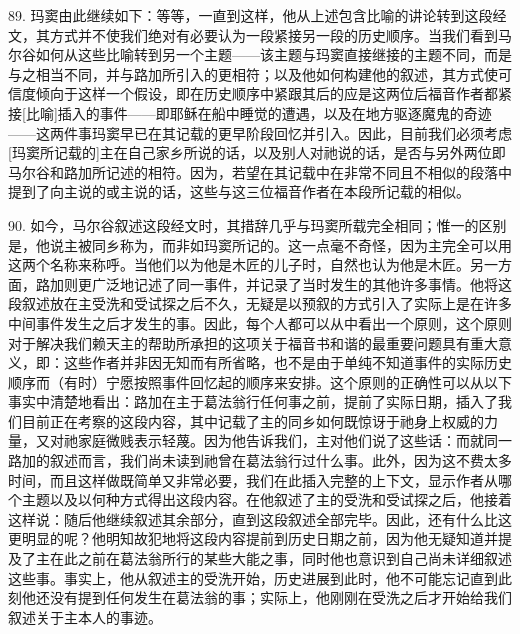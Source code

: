 89. 玛窦由此继续如下：等等，一直到这样，他从上述包含比喻的讲论转到这段经文，其方式并不使我们绝对有必要认为一段紧接另一段的历史顺序。当我们看到马尔谷如何从这些比喻转到另一个主题——该主题与玛窦直接继接的主题不同，而是与之相当不同，并与路加所引入的更相符；以及他如何构建他的叙述，其方式使可信度倾向于这样一个假设，即在历史顺序中紧跟其后的应是这两位后福音作者都紧接[比喻]插入的事件——即耶稣在船中睡觉的遭遇，以及在地方驱逐魔鬼的奇迹——这两件事玛窦早已在其记载的更早阶段回忆并引入。因此，目前我们必须考虑[玛窦所记载的]主在自己家乡所说的话，以及别人对祂说的话，是否与另外两位即马尔谷和路加所记述的相符。因为，若望在其记载中在非常不同且不相似的段落中提到了向主说的或主说的话，这些与这三位福音作者在本段所记载的相似。\par

90. 如今，马尔谷叙述这段经文时，其措辞几乎与玛窦所载完全相同；惟一的区别是，他说主被同乡称为，而非如玛窦所记的。这一点毫不奇怪，因为主完全可以用这两个名称来称呼。当他们以为他是木匠的儿子时，自然也认为他是木匠。另一方面，路加则更广泛地记述了同一事件，并记录了当时发生的其他许多事情。他将这段叙述放在主受洗和受试探之后不久，无疑是以预叙的方式引入了实际上是在许多中间事件发生之后才发生的事。因此，每个人都可以从中看出一个原则，这个原则对于解决我们赖天主的帮助所承担的这项关于福音书和谐的最重要问题具有重大意义，即：这些作者并非因无知而有所省略，也不是由于单纯不知道事件的实际历史顺序而（有时）宁愿按照事件回忆起的顺序来安排。这个原则的正确性可以从以下事实中清楚地看出：路加在主于葛法翁行任何事之前，提前了实际日期，插入了我们目前正在考察的这段内容，其中记载了主的同乡如何既惊讶于祂身上权威的力量，又对祂家庭微贱表示轻蔑。因为他告诉我们，主对他们说了这些话：而就同一路加的叙述而言，我们尚未读到祂曾在葛法翁行过什么事。此外，因为这不费太多时间，而且这样做既简单又非常必要，我们在此插入完整的上下文，显示作者从哪个主题以及以何种方式得出这段内容。在他叙述了主的受洗和受试探之后，他接着这样说：随后他继续叙述其余部分，直到这段叙述全部完毕。因此，还有什么比这更明显的呢？他明知故犯地将这段内容提前到历史日期之前，因为他无疑知道并提及了主在此之前在葛法翁所行的某些大能之事，同时他也意识到自己尚未详细叙述这些事。事实上，他从叙述主的受洗开始，历史进展到此时，他不可能忘记直到此刻他还没有提到任何发生在葛法翁的事；实际上，他刚刚在受洗之后才开始给我们叙述关于主本人的事迹。\par

